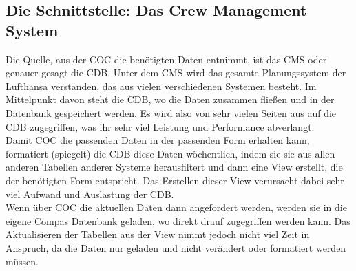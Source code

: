 \documentclass [12pt, a4paper, oneside, titlepage, ngerman]{article}
\begin{document}
\subsection {Die Schnittstelle: Das Crew Management System}
Die Quelle, aus der \ac{COC} die benötigten Daten entnimmt, ist das \ac{CMS} oder genauer gesagt die \ac{CDB}. Unter dem \ac{CMS} wird das gesamte Planungssystem der Lufthansa verstanden, das aus vielen verschiedenen Systemen besteht. Im Mittelpunkt davon steht die \ac{CDB}, wo die Daten zusammen fließen und in der Datenbank gespeichert werden. Es wird also von sehr vielen Seiten aus auf die \ac{CDB} zugegriffen, was ihr sehr viel Leistung und Performance abverlangt. \\
Damit \ac{COC} die passenden Daten in der passenden Form erhalten kann, formatiert (spiegelt) die \ac{CDB} diese Daten wöchentlich, indem sie sie aus allen anderen Tabellen anderer Systeme herausfiltert und dann eine View erstellt, die der benötigten Form entspricht. Das Erstellen dieser View verursacht dabei sehr viel Aufwand und Auslastung der \ac{CDB}.\\
Wenn über \ac{COC} die aktuellen Daten dann angefordert werden, werden sie in die eigene Compas Datenbank geladen, wo direkt drauf zugegriffen werden kann. Das Aktualisieren der Tabellen aus der View nimmt jedoch nicht viel Zeit in Anspruch, da die Daten nur geladen und nicht verändert oder formatiert werden müssen.



\
\end{document}
